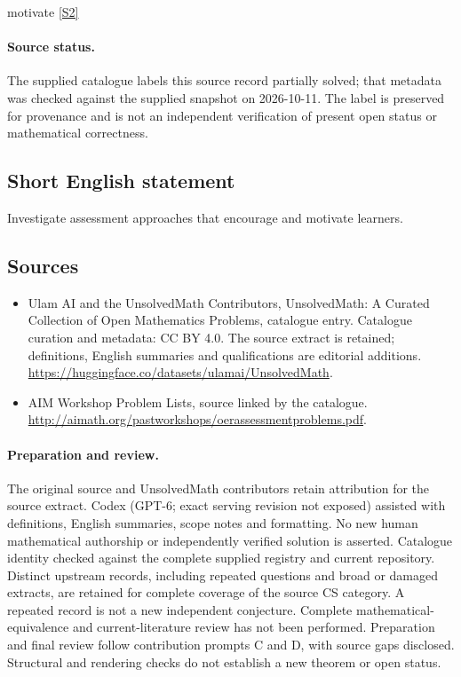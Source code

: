 \documentclass[11pt]{article}
\newcommand{\sref}[2]{\hyperlink{source:#1:#2}{[S#2]}}
\begin{document}
motivate \sref{statement}{2}
\paragraph{Source status.}
The supplied catalogue labels this source record partially solved; that metadata was checked against the supplied snapshot on 2026-10-11. The label is preserved for provenance and is not an independent verification of present open status or mathematical correctness.
\subsection{Short English statement}
Investigate assessment approaches that encourage and motivate learners.
\subsection{Sources}
\begin{itemize}
\item[\hypertarget{source:statement:1}{S1}] Ulam AI and the UnsolvedMath Contributors, UnsolvedMath: A Curated Collection of Open Mathematics Problems, catalogue entry. Catalogue curation and metadata: CC BY 4.0. The source extract is retained; definitions, English summaries and qualifications are editorial additions.
\url{https://huggingface.co/datasets/ulamai/UnsolvedMath}.
\item[\hypertarget{source:statement:2}{S2}] AIM Workshop Problem Lists, source linked by the catalogue.
\url{http://aimath.org/pastworkshops/oerassessmentproblems.pdf}.
\end{itemize}
\paragraph{Preparation and review.}
The original source and UnsolvedMath contributors retain attribution for the source extract. Codex (GPT-6; exact serving revision not exposed) assisted with definitions, English summaries, scope notes and formatting. No new human mathematical authorship or independently verified solution is asserted. Catalogue identity checked against the complete supplied registry and current repository. Distinct upstream records, including repeated questions and broad or damaged extracts, are retained for complete coverage of the source CS category. A repeated record is not a new independent conjecture. Complete mathematical-equivalence and current-literature review has not been performed. Preparation and final review follow contribution prompts C and D, with source gaps disclosed. Structural and rendering checks do not establish a new theorem or open status.
\label{end:statement}
\end{document}
